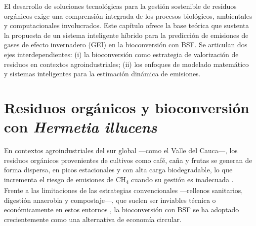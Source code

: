 El desarrollo de soluciones tecnológicas para la gestión sostenible de residuos orgánicos exige una comprensión integrada de los procesos biológicos, ambientales y computacionales involucrados. Este capítulo ofrece la base teórica que sustenta la propuesta de un sistema inteligente híbrido para la predicción de emisiones de gases de efecto invernadero (GEI) en la bioconversión con BSF. Se articulan dos ejes interdependientes: (i) la bioconversión como estrategia de valorización de residuos en contextos agroindustriales; (ii) los enfoques de modelado matemático y sistemas inteligentes para la estimación dinámica de emisiones.

\section{Residuos orgánicos y bioconversión con \textit{Hermetia illucens}}

En contextos agroindustriales del sur global —como el Valle del Cauca—, los residuos orgánicos provenientes de cultivos como café, caña y frutas se generan de forma dispersa, en picos estacionales y con alta carga biodegradable, lo que incrementa el riesgo de emisiones de CH\textsubscript{4} cuando su gestión es inadecuada \parencite{lacknerAgriculturalWasteChallenges2025,leddinImpactClimateChange2024a}. Frente a las limitaciones de las estrategias convencionales —rellenos sanitarios, digestión anaerobia y compostaje—, que suelen ser inviables técnica o económicamente en estos entornos \parencite{kongEvaluatingGreenhouseGas2012,nordahlGreenhouseGasAir2023a}, la bioconversión con BSF se ha adoptado crecientemente como una alternativa de economía circular.

